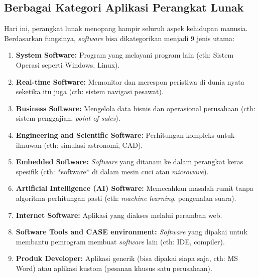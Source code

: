 \documentclass[12pt,a4paper]{article}
\begin{document}
\subsection{Berbagai Kategori Aplikasi Perangkat Lunak}
Hari ini, perangkat lunak menopang hampir seluruh aspek kehidupan manusia. Berdasarkan fungsinya, \textit{software} bisa dikategorikan menjadi 9 jenis utama:
\begin{enumerate}
    \item \textbf{System Software:} Program yang melayani program lain (cth: Sistem Operasi seperti Windows, Linux).
    \item \textbf{Real-time Software:} Memonitor dan merespon peristiwa di dunia nyata seketika itu juga (cth: sistem navigasi pesawat).
    \item \textbf{Business Software:} Mengelola data bisnis dan operasional perusahaan (cth: sistem penggajian, \textit{point of sales}).
    \item \textbf{Engineering and Scientific Software:} Perhitungan kompleks untuk ilmuwan (cth: simulasi astronomi, CAD).
    \item \textbf{Embedded Software:} \textit{Software} yang ditanam ke dalam perangkat keras spesifik (cth: *software* di dalam mesin cuci atau \textit{microwave}).
    \item \textbf{Artificial Intelligence (AI) Software:} Memecahkan masalah rumit tanpa algoritma perhitungan pasti (cth: \textit{machine learning}, pengenalan suara).
    \item \textbf{Internet Software:} Aplikasi yang diakses melalui peramban web.
    \item \textbf{Software Tools and CASE environment:} \textit{Software} yang dipakai untuk membantu pemrogram membuat \textit{software} lain (cth: IDE, compiler).
    \item \textbf{Produk Developer:} Aplikasi generik (bisa dipakai siapa saja, cth: MS Word) atau aplikasi kustom (pesanan khusus satu perusahaan).
\end{enumerate}
\end{document}

